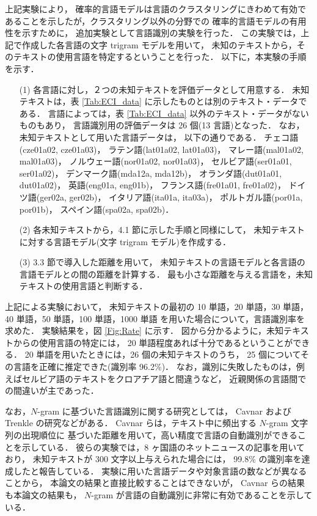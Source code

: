 上記実験により，
確率的言語モデルは言語のクラスタリングにきわめて有効で
あることを示したが，クラスタリング以外の分野での
確率的言語モデルの有用性を示すために，
追加実験として言語識別の実験を行った．
この実験では，上記で作成した各言語の文字 trigram モデルを用いて，
未知のテキストから，そのテキストの使用言語を特定するということを行った．
以下に，本実験の手順を示す．
\begin{itemize}
\item[(1)]
各言語に対し，２つの未知テキストを評価データとして用意する．
未知テキストは，表 \ref{Tab:ECI_data} に示したものとは別のテキスト・データである．
言語によっては，表 \ref{Tab:ECI_data} 以外のテキスト・データがないものもあり，
言語識別用の評価データは 26 個(13 言語)となった．
なお，未知テキストとして用いた言語データは，
以下の通りである．
チェコ語(cze01a02, cze01a03)， 
 ラテン語(lat01a02, lat01a03)， 
 マレー語(mal01a02, mal01a03)， 
 ノルウェー語(nor01a02, nor01a03)， 
 セルビア語(ser01a01, ser01a02)， 
 デンマーク語(mda12a, mda12b)， 
 オランダ語(dut01a01, dut01a02)， 
 英語(eng01a, eng01b)， 
 フランス語(fre01a01, fre01a02)， 
 ドイツ語(ger02a, ger02b)， 
 イタリア語(ita01a, ita03a)， 
 ポルトガル語(por01a, por01b)， 
 スペイン語(spa02a, spa02b)．

\item[(2)]
各未知テキストから，4.1 節に示した手順と同様にして，
未知テキストに対する言語モデル(文字 trigram モデル)を作成する．

\item[(3)]
3.3 節で導入した距離を用いて，
未知テキストの言語モデルと各言語の言語モデルとの間の距離を計算する．
最も小さな距離を与える言語を，未知テキストの使用言語と判断する．
\end{itemize}

上記による実験において，
未知テキストの最初の 10 単語，20 単語，30 単語，40 単語，50 単語，100 単語，1000 単語
を用いた場合について，言語識別率を求めた．
実験結果を，図 \ref{Fig:Rate} に示す．
図から分かるように，未知テキストからの使用言語の特定には，
20 単語程度あれば十分であるということができる．
20 単語を用いたときには，26 個の未知テキストのうち，
25 個についてその言語を正確に推定できた(識別率 96.2\%)．
なお，識別に失敗したものは，例えばセルビア語のテキストをクロアチア語と間違うなど，
近親関係の言語間での間違いが主であった．

なお，$N$-gram に基づいた言語識別に関する研究としては，
Cavnar および Trenkle の研究\cite{Cavnar94}などがある．
Cavnar らは，テキスト中に頻出する $N$-gram 文字列の出現順位に
基づいた距離を用いて，高い精度で言語の自動識別ができることを示している．
彼らの実験では，8 ヶ国語のネットニュースの記事を用いており，
未知テキストが 300 文字以上与えられた場合には，
99.8\% の識別率を達成したと報告している．
実験に用いた言語データや対象言語の数などが異なることから，
本論文の結果と直接比較することはできないが，
Cavnar らの結果も本論文の結果も，
$N$-gram が言語の自動識別に非常に有効であることを示している．

